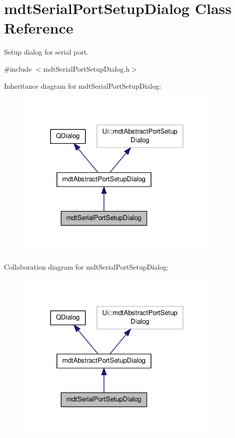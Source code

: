 \hypertarget{classmdt_serial_port_setup_dialog}{\section{mdt\-Serial\-Port\-Setup\-Dialog Class Reference}
\label{classmdt_serial_port_setup_dialog}
}


Setup dialog for serial port.  




{\ttfamily \#include $<$mdt\-Serial\-Port\-Setup\-Dialog.\-h$>$}



Inheritance diagram for mdt\-Serial\-Port\-Setup\-Dialog\-:
\nopagebreak
\begin{figure}[H]
\begin{center}
\leavevmode
\includegraphics[width=278pt]{classmdt_serial_port_setup_dialog__inherit__graph}
\end{center}
\end{figure}


Collaboration diagram for mdt\-Serial\-Port\-Setup\-Dialog\-:
\nopagebreak
\begin{figure}[H]
\begin{center}
\leavevmode
\includegraphics[width=278pt]{classmdt_serial_port_setup_dialog__coll__graph}
\end{center}
\end{figure}
